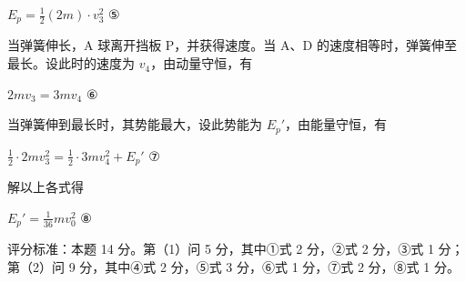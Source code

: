 \documentclass[\gkver]{gaokaozhenti}
\begin{document}
\begin{enumerate}
{$E_{p}=\frac{1}{2}(2m)\cdot v_{3}^{2}$ ⑤

当弹簧伸长，A 球离开挡板 P，并获得速度。当 A、D 的速度相等时，弹簧伸至最长。设此时的速度为 $v_{4}$，由动量守恒，有

$2mv_{3}=3mv_{4}$ ⑥

当弹簧伸到最长时，其势能最大，设此势能为 $E_{p}'$，由能量守恒，有

$\frac{1}{2}\cdot2mv_{3}^{2}=\frac{1}{2}\cdot3mv_{4}^{2}+E_{p}'$ ⑦

解以上各式得

$E_{p}'=\frac{1}{36}mv_{0}^{2}$ ⑧

评分标准：本题 14 分。第（1）问 5 分，其中①式 2 分，②式 2 分，③式 1 分；第（2）问 9 分，其中④式 2 分，⑤式 3 分，⑥式 1 分，⑦式 2 分，⑧式 1 分。
}

\end{enumerate}
\end{document}
